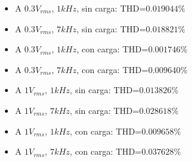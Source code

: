 \begin{itemize}
\item A $0.3V_{rms}$, $1kHz$, sin carga: THD=$0.019044\%$
\item A $0.3V_{rms}$, $7kHz$, sin carga: THD=$0.018821\%$
\item A $0.3V_{rms}$, $1kHz$, con carga: THD=$0.001746\%$
\item A $0.3V_{rms}$, $7kHz$, con carga: THD=$0.009640\%$
\item A $1V_{rms}$, $1kHz$, sin carga: THD=$0.013826\%$
\item A $1V_{rms}$, $7kHz$, sin carga: THD=$0.028618\%$
\item A $1V_{rms}$, $1kHz$, con carga: THD=$0.009658\%$
\item A $1V_{rms}$, $7kHz$, con carga: THD=$0.037628\%$
\end{itemize}